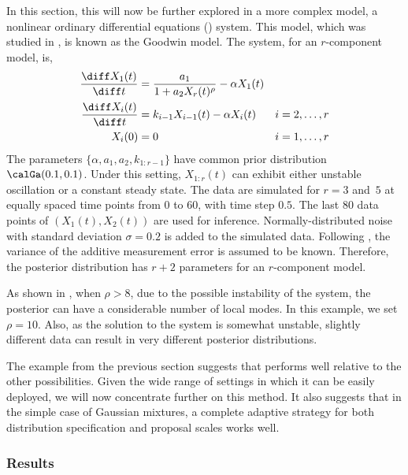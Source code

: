 In this section, this will now be further explored in a more complex model, a nonlinear ordinary differential equations (\ode) system. This model, which was studied in \cite{Calderhead:2009bd}, is known as the Goodwin model. The \ode system, for an $r$-component model, is,
\begin{align*}
  \frac{\diff X_1(t)}{\diff t} &= \frac{a_1}{1 + a_2 X_r(t)^{\rho}}
  - \alpha X_1(t)  & \\
  \frac{\diff X_i(t)}{\diff t} &= k_{i-1}X_{i-1}(t) - \alpha X_i(t)
  & i = 2,\dots,r \\
  X_i(0) &= 0 & i = 1,\dots,r
\end{align*}
The parameters $\{\alpha,a_1,a_2,k_{1:r-1}\}$ have common prior distribution $\calGa(0.1, 0.1)$. Under this setting, $X_{1:r}(t)$ can exhibit either unstable oscillation or a constant steady state. The data are simulated for $r=3$ and~$5$ at equally spaced time points from $0$ to $60$, with time step $0.5$. The last 80 data points of $(X_1(t), X_2(t))$ are used for inference. Normally-distributed noise with standard deviation $\sigma=0.2$ is added to the simulated data. Following \cite{Calderhead:2009bd}, the variance of the additive measurement error is assumed to be known. Therefore, the posterior distribution has $r+2$ parameters for an $r$-component model.

As shown in \cite{Calderhead:2009bd}, when $\rho > 8$, due to the possible instability of the \ode system, the posterior can have a considerable number of local modes. In this example, we set $\rho = 10$. Also, as the solution to the \ode system is somewhat unstable, slightly different data can result in very different posterior distributions.

The example from the previous section suggests that \smc[2] performs well relative to the other \smc possibilities. Given the wide range of settings in which it can be easily deployed, we will now concentrate further on this method. It also suggests that in the simple case of Gaussian mixtures, a complete adaptive strategy for both distribution specification and proposal scales works well.

\subsubsection{Results}

